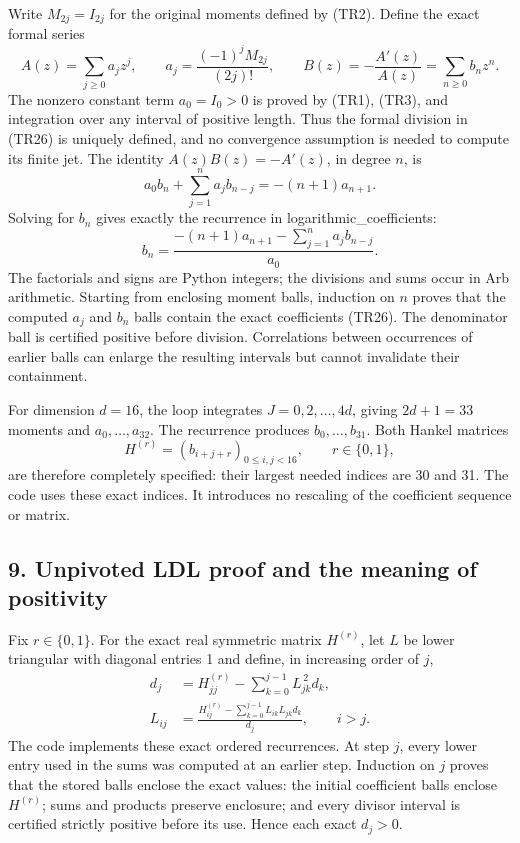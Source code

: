 Write \(M_{2j}=I_{2j}\) for the original moments defined by (TR2). Define the exact formal series \[
 A(z)=\sum_{j\geq0}a_jz^j,\qquad
 a_j=\frac{(-1)^jM_{2j}}{(2j)!},\qquad
 B(z)=-\frac{A'(z)}{A(z)}=\sum_{n\geq0}b_nz^n.
 \tag{TR26}
\] The nonzero constant term \(a_0=I_0>0\) is proved by (TR1), (TR3), and integration over any interval of positive length. Thus the formal division in (TR26) is uniquely defined, and no convergence assumption is needed to compute its finite jet. The identity \(A(z)B(z)=-A'(z)\), in degree \(n\), is \[
 a_0b_n+\sum_{j=1}^na_jb_{n-j}=-(n+1)a_{n+1}.
 \tag{TR27}
\] Solving for \(b_n\) gives exactly the recurrence in logarithmic\_coefficients: \[
 b_n=\frac{-(n+1)a_{n+1}-\sum_{j=1}^na_jb_{n-j}}{a_0}.
 \tag{TR28}
\] The factorials and signs are Python integers; the divisions and sums occur in Arb arithmetic. Starting from enclosing moment balls, induction on \(n\) proves that the computed \(a_j\) and \(b_n\) balls contain the exact coefficients (TR26). The denominator ball is certified positive before division. Correlations between occurrences of earlier balls can enlarge the resulting intervals but cannot invalidate their containment.

For dimension \(d=16\), the loop integrates \(J=0,2,\ldots,4d\), giving \(2d+1=33\) moments and \(a_0,\ldots,a_{32}\). The recurrence produces \(b_0,\ldots,b_{31}\). Both Hankel matrices \[
 H^{(r)}=(b_{i+j+r})_{0\leq i,j<16},\qquad r\in\{0,1\},
 \tag{TR29}
\] are therefore completely specified: their largest needed indices are 30 and 31. The code uses these exact indices. It introduces no rescaling of the coefficient sequence or matrix.

\subsection{9. Unpivoted LDL proof and the meaning of positivity}\label{unpivoted-ldl-proof-and-the-meaning-of-positivity}

Fix \(r\in\{0,1\}\). For the exact real symmetric matrix \(H^{(r)}\), let \(L\) be lower triangular with diagonal entries 1 and define, in increasing order of \(j\), \[
 \begin{aligned}
 d_j&=H^{(r)}_{jj}-\sum_{k=0}^{j-1}L_{jk}^{\,2}d_k,\\
 L_{ij}&=\frac{H^{(r)}_{ij}
 -\sum_{k=0}^{j-1}L_{ik}L_{jk}d_k}{d_j},
 \qquad i>j.
 \end{aligned}
 \tag{TR30}
\] The code implements these exact ordered recurrences. At step \(j\), every lower entry used in the sums was computed at an earlier step. Induction on \(j\) proves that the stored balls enclose the exact values: the initial coefficient balls enclose \(H^{(r)}\); sums and products preserve enclosure; and every divisor interval is certified strictly positive before its use. Hence each exact \(d_j>0\).

